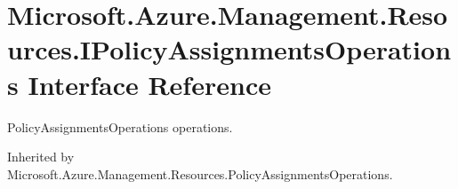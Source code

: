 \hypertarget{interface_microsoft_1_1_azure_1_1_management_1_1_resources_1_1_i_policy_assignments_operations}{}\section{Microsoft.\+Azure.\+Management.\+Resources.\+I\+Policy\+Assignments\+Operations Interface Reference}
\label{interface_microsoft_1_1_azure_1_1_management_1_1_resources_1_1_i_policy_assignments_operations}


Policy\+Assignments\+Operations operations.  




Inherited by Microsoft.\+Azure.\+Management.\+Resources.\+Policy\+Assignments\+Operations.


